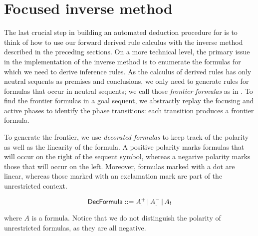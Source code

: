 \section{Focused inverse method}

The last crucial step in building an automated deduction procedure for \zss{} is
to think of how to use our forward derived rule calculus with the inverse method
described in the preceding sections. On a more technical level, the primary
issue in the implementation of the inverse method is to enumerate the formulas
for which we need to derive inference rules. As the calculus of derived rules
has only neutral sequents as premises and conclusions, we only need to generate
rules for formulas that occur in neutral sequents; we call those \emph{frontier
  formulas} as in \cite{chaudhuri-thesis}. To find the frontier formulas in a
goal sequent, we abstractly replay the focusing and active phases to identify
the phase transitions: each transition produces a frontier formula.

To generate the frontier, we use \emph{decorated formulas} to keep track of the
polarity as well as the linearity of the formula. A positive polarity marks
formulas that will occur on the right of the sequent symbol, whereas a negarive
polarity marks those that will occur on the left. Moreover, formulas marked with
a dot are linear, whereas those marked with an exclamation mark are part of the
unrestricted context.

\[
  \textsf{DecFormula} ::= A_.^+ \, | \,
    A_.^- \, | \,
    A_!
\]

where $A$ is a formula. Notice that we do not distinguish the polarity of
unrestricted formulas, as they are all negative.

